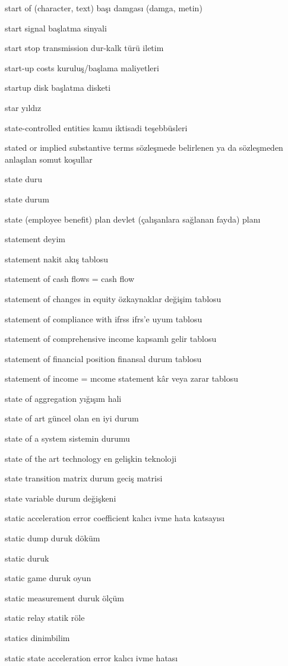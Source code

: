 \documentclass[12pt,fleqn]{article}\usepackage{../../common}
\begin{document}
start of (character, text) başı damgası (damga, metin)

start signal başlatma sinyali

start stop transmission dur-kalk türü iletim

start-up costs kuruluş/başlama maliyetleri

startup disk başlatma disketi

star yıldız

state-controlled entities kamu iktisadi teşebbüsleri

stated or implied substantive terms sözleşmede belirlenen ya da sözleşmeden anlaşılan somut koşullar

state duru

state durum

state (employee benefit) plan devlet (çalışanlara sağlanan fayda) planı

statement deyim

statement nakit akış tablosu

statement of cash flows = cash flow

statement of changes in equity özkaynaklar değişim tablosu

statement of compliance with ifrss ifrs'e uyum tablosu

statement of comprehensive income kapsamlı gelir tablosu

statement of financial position finansal durum tablosu

statement of income = ıncome statement kâr veya zarar tablosu

state of aggregation yığışım hali

state of art güncel olan en iyi durum

state of a system sistemin durumu

state of the art technology en gelişkin teknoloji

state transition matrix durum geciş matrisi

state variable durum değişkeni

static acceleration error coefficient kalıcı ivme hata katsayısı

static dump duruk döküm

static duruk

static game duruk oyun

static measurement duruk ölçüm

static relay statik röle

statics dinimbilim

static state acceleration error kalıcı ivme hatası
\end{document}
